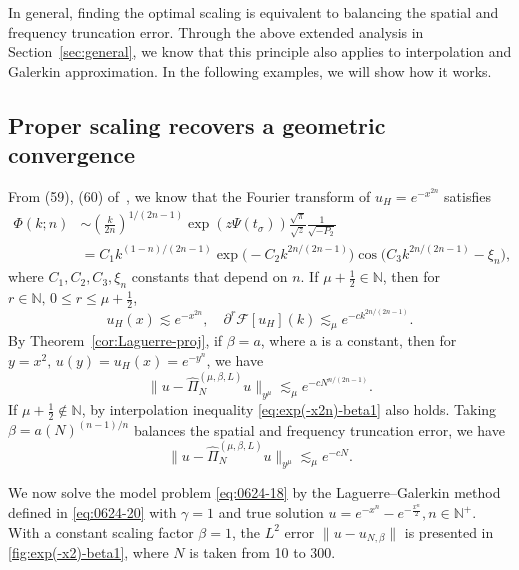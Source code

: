 \documentclass[pdflatex,sn-aps]{sn-jnl}%
\theoremstyle{thmstyleone}%
\theoremstyle{thmstyletwo}%
\theoremstyle{thmstylethree}%
\begin{document}
In general, finding the optimal scaling is equivalent to balancing the spatial and frequency truncation error. 
Through the above extended analysis in Section~\ref{sec:general}, we know that this principle also applies to
interpolation and Galerkin approximation. In the following examples, we will show how it works.

\subsection{Proper scaling recovers a geometric convergence}
\label{subsec: exp conv}
From (59), (60) of~\cite{boyd2014fourier}, we know that the Fourier transform of $u_H = e^{-x^{2n}}$ satisfies
\begin{displaymath}
  \begin{aligned}
  \Phi(k ; n) &\sim\left(\frac{k}{2 n}\right)^{1 /(2 n-1)} \exp \left(z \Psi\left(t_\sigma\right)\right) \frac{\sqrt{\pi}}{\sqrt{z}} \frac{1}{\sqrt{-P_2}} \\
  & =C_1 k^{(1-n) /(2 n-1)} \exp \bigl(-C_2 k^{2 n /(2 n-1)}\bigr) \cos \bigl(C_3 k^{2 n /(2 n-1)}-\xi_n\bigr),
  \end{aligned}
\end{displaymath}
where $C_1, C_2, C_3, \xi_n$ constants that depend on $n$.
If $\mu + \frac{1}{2} \in \mathbb{N}$, then for $r \in \mathbb{N},\, 0 \leqslant r \leqslant \mu + \frac{1}{2}$,  
\begin{displaymath}
  u_H(x) \lesssim e^{-x^{2n}}, \quad \partial^r \mathcal{F}[u_H](k) \lesssim_\mu e^{-c k^{2n/(2n-1)}}.
\end{displaymath}
By Theorem~\ref{cor:Laguerre-proj}, if $\beta = a$, where a is a constant, then
for $y = x^2,\,u(y) = u_H(x) = e^{-y^n}$, we have
\begin{equation}\label{eq:exp(-x2n)-beta1}
  \|u - \widehat{\Pi}_{N}^{(\mu,\beta,L)} u\|_{y^{\mu}} \lesssim_\mu e^{-c N^{n/(2n-1)}}.
\end{equation}
If $\mu + \frac{1}{2} \notin \mathbb{N}$, by interpolation inequality \eqref{eq:exp(-x2n)-beta1} also holds.
Taking $\beta = a \left(N\right)^{(n-1)/n}$ balances the spatial and frequency truncation error, we have
\begin{equation}\label{eq:exp(-x2n)-beta-opt}
  \|u - \widehat{\Pi}_{N}^{(\mu,\beta,L)} u\|_{y^{\mu}} \lesssim_\mu e^{-c N}.
\end{equation}

We now solve the model problem \eqref{eq:0624-18} by the Laguerre--Galerkin method defined in \eqref{eq:0624-20} with $\gamma = 1$ and true solution $u = e^{-x^n}-e^{-\frac{x^n}{2}},n\in \mathbb{N}^+$. 
With a constant scaling factor $\beta = 1$, the $L^2$  error $\|u - u_{N,\beta}\|$ is presented in \ref{fig:exp(-x2)-beta1}, where $N$ is taken from 10 to 300.
\end{document}

